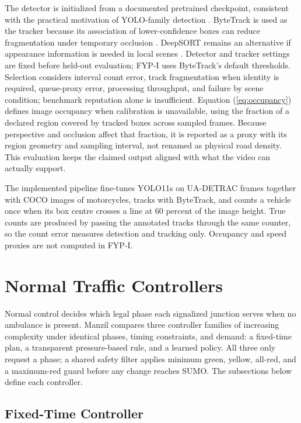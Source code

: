 The detector is initialized from a documented pretrained checkpoint, consistent with the practical motivation of YOLO-family detection \cite{redmon2016yolo}. ByteTrack is used as the tracker because its association of lower-confidence boxes can reduce fragmentation under temporary occlusion \cite{zhang2022bytetrack}. DeepSORT remains an alternative if appearance information is needed in local scenes \cite{wojke2017deepsort}. Detector and tracker settings are fixed before held-out evaluation; FYP-I uses ByteTrack's default thresholds. Selection considers interval count error, track fragmentation when identity is required, queue-proxy error, processing throughput, and failure by scene condition; benchmark reputation alone is insufficient. Equation (\ref{eq:occupancy}) defines image occupancy when calibration is unavailable, using the fraction of a declared region covered by tracked boxes across sampled frames. Because perspective and occlusion affect that fraction, it is reported as a proxy with its region geometry and sampling interval, not renamed as physical road density. This evaluation keeps the claimed output aligned with what the video can actually support.

The implemented pipeline fine-tunes YOLO11s on UA-DETRAC frames together with COCO images of motorcycles, tracks with ByteTrack, and counts a vehicle once when its box centre crosses a line at 60 percent of the image height. True counts are produced by passing the annotated tracks through the same counter, so the count error measures detection and tracking only. Occupancy and speed proxies are not computed in FYP-I.

\section{Normal Traffic Controllers}

Normal control decides which legal phase each signalized junction serves when no ambulance is present. Manzil compares three controller families of increasing complexity under identical phases, timing constraints, and demand: a fixed-time plan, a transparent pressure-based rule, and a learned policy. All three only request a phase; a shared safety filter applies minimum green, yellow, all-red, and a maximum-red guard before any change reaches SUMO. The subsections below define each controller.

\subsection{Fixed-Time Controller}

